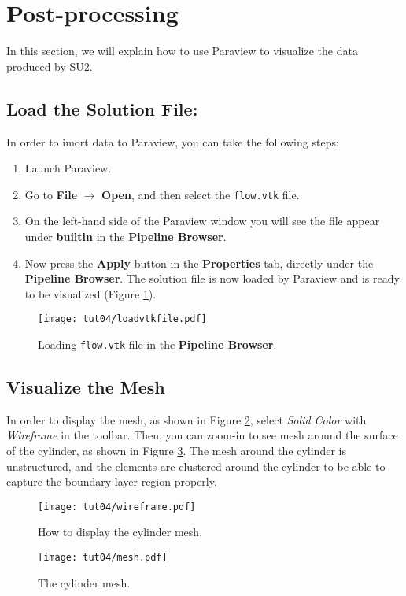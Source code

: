 \section{Post-processing}
In this section, we will explain how to use Paraview to visualize the data produced by SU2.
\subsection{Load the Solution File:}
In order to imort data to Paraview, you can take the following steps:
\begin{enumerate}[label=\arabic*)]
	\setcounter{enumi}{0}
	\item Launch Paraview.
	\item Go to \textbf{File} $\rightarrow$ \textbf{Open}, and then select the \texttt{flow.vtk} file.
	\item On the left-hand side of the Paraview window you will see the file appear under \textbf{builtin} in the \textbf{Pipeline Browser}.
	\item Now press the \textbf{Apply} button in the \textbf{Properties} tab, directly under the \textbf{Pipeline Browser}. The solution file is now loaded by Paraview and is ready to be visualized (Figure \ref{fig4:load}).
\end{enumerate}
\begin{figure}[H]
    \centering
    \texttt{[image: tut04/loadvtkfile.pdf]}
    \caption{Loading \texttt{flow.vtk} file in the \textbf{Pipeline Browser}.}
    \label{fig4:load}
\end{figure}
\subsection{Visualize the Mesh}
In order to display the mesh, as shown in Figure \ref{fig4:wireframe_4}, select \textit{Solid Color} with \textit{Wireframe} in the toolbar. Then, you can zoom-in to see mesh around the surface of the cylinder, as shown in Figure \ref{fig4:mesh_4}. The mesh around the cylinder is unstructured, and the elements are clustered around the cylinder to be able to capture the boundary layer region properly.
\begin{figure}[ht]
    \centering
    \texttt{[image: tut04/wireframe.pdf]}
    \caption{How to display the cylinder mesh.}
    \label{fig4:wireframe_4}
\end{figure}
\begin{figure}[ht]
    \centering
    \texttt{[image: tut04/mesh.pdf]}
    \caption{The cylinder mesh.}
    \label{fig4:mesh_4}
\end{figure}

